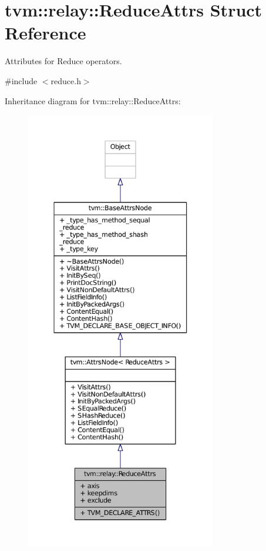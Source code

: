 \hypertarget{structtvm_1_1relay_1_1ReduceAttrs}{}\section{tvm\+:\+:relay\+:\+:Reduce\+Attrs Struct Reference}
\label{structtvm_1_1relay_1_1ReduceAttrs}


Attributes for Reduce operators.  




{\ttfamily \#include $<$reduce.\+h$>$}



Inheritance diagram for tvm\+:\+:relay\+:\+:Reduce\+Attrs\+:
\nopagebreak
\begin{figure}[H]
\begin{center}
\leavevmode
\includegraphics[height=550pt]{structtvm_1_1relay_1_1ReduceAttrs__inherit__graph}
\end{center}
\end{figure}


